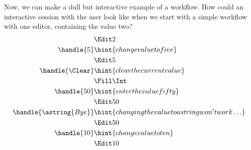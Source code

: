 Now, we can make a dull but interactive example of a workflow.
How could an interactive session with the user look like when we start with a simple workflow with one editor,
containing the value two?
\begin{align*}
    & \Edit 2 \\
  \handle{5} & \hint{change value to five} \\
    & \Edit 5 \\
  \handle{\Clear} & \hint{clear the current value} \\
    & \Fill \Int \\
  \handle{50} & \hint{enter the value fifty} \\
    & \Edit 50 \\
  \handle{\astring{Bye}} & \hint{changing the value to a string won't work\ldots} \\
    & \Edit 50 \\
  \handle{10} & \hint{change value to ten} \\
    & \Edit 10
\end{align*}
